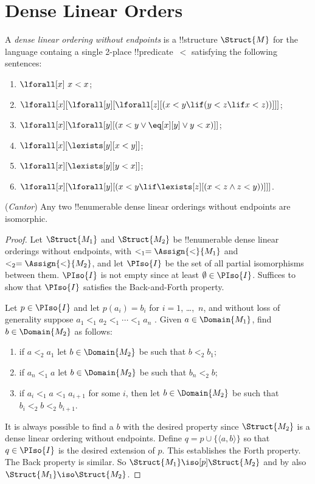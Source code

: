 \documentclass[../../include/open-logic-section]{subfiles}
\begin{document}
\section{Dense Linear Orders}

\begin{defn}
  A \emph{dense linear ordering without endpoints} is a !!{structure}
  $\Struct{M}$ for the language containg a single 2-place
  !!{predicate}~$<$ satisfying the following sentences:
  \begin{enumerate}
  \item $\lforall[x] \ x < x$;
  \item $\lforall[x][\lforall[y][\lforall[z][(x < y \lif (y < z \lif x
    <z ))]]]$;
  \item $\lforall[x][\lforall[y][(x< y \lor \eq[x][y] \lor y < x)]]$; 
  \item $\lforall[x][\lexists[y][x < y]]$;
  \item $\lforall[x][\lexists[y][y < x]]$;
  \item $\lforall[x][\lforall[y][(x < y \lif \lexists[z][(x < z \land
        z < y))]]]$.
 \end{enumerate}
\end{defn}

\begin{thm}
  (\emph{Cantor}) Any two !!{enumerable} dense linear orderings without
  endpoints are isomorphic.
\end{thm}

\begin{proof}
  Let $\Struct{M_1}$ and $\Struct{M_2}$ be !!{enumerable} dense linear
  orderings without endpoints, with $<_1 = \Assign{<}{M_1}$ and $<_2 =
  \Assign{<}{M_2}$, and let $\PIso{I}$ be the set of all partial
  isomorphisms between them. $\PIso{I}$ is not empty since at least
  $\emptyset \in \PIso{I}$. Suffices to show that $\PIso{I}$ satisfies
  the Back-and-Forth property.

  Let $p \in \PIso{I}$ and let $p(a_i) = b_i$ for $i = 1$, \dots,~$n$,
  and without loss of generality suppose $a_1 <_1 a_2 <_1 \cdots <_1
  a_n$ . Given $a \in \Domain{M_1}$, find $b \in \Domain{M_2}$ as
  follows:
  \begin{enumerate}
  \item if $a <_2 a_1$ let $b \in \Domain{M_2}$ be such that $b <_2
    b_1$;
  \item if $a_n <_1 a$ let $b \in \Domain{M_2}$ be such that $b_n <_2 b$;
 \item if $a_i <_1 a <_1 a_{i+1}$ for some $i$, then let $b \in
   \Domain{M_2}$ be such that $b_i <_2 b <_2 b_{i+1}$.
  \end{enumerate}
  It is always possible to find a $b$ with the desired property since
  $\Struct{M_2}$ is a dense linear ordering without endpoints. Define
  $q = p \cup \{ \langle a, b \rangle \}$ so that $q \in \PIso{I}$ is
  the desired extension of $p$. This establishes the Forth
  property. The Back property is similar. So $\Struct{M_1} \iso[p]
  \Struct{M_2}$ and by  also
  $\Struct{M_1} \iso \Struct{M_2}$.
\end{proof}
\end{document}
